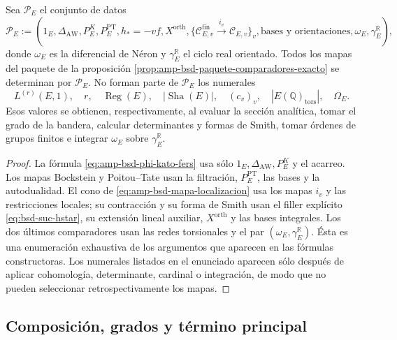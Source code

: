 \begin{lemma}
\label{lem:amp-bsd-independencia-termino-principal}
Sea \(\mathscr P_E\) el conjunto de datos
\begin{equation}\label{eq:amp-bsd-primitivas-paquete}
 \mathscr P_E:=
 \left(
  1_E,\Delta_{\mathrm{AW}},P_E^K,P_E^{\mathrm{PT}},
  h_*=-vf,X^{\mathrm{orth}},
  \{\mathcal C_{E,v}^{\mathrm{fin}}\xrightarrow{i_v}
     \mathcal C_{E,v}\}_v,
  \text{bases y orientaciones},
  \omega_E,\gamma_E^{\mathbb R}
 \right),
\end{equation}
donde \(\omega_E\) es la diferencial de Néron y
\(\gamma_E^{\mathbb R}\) el ciclo real orientado. Todos los mapas del
paquete de la proposición
\ref{prop:amp-bsd-paquete-comparadores-exacto} se determinan por
\(\mathscr P_E\). No forman parte de \(\mathscr P_E\) los numerales
\[
 L^{(r)}(E,1),\quad r,\quad\operatorname{Reg}(E),\quad
 |\operatorname{Sha}(E)|,\quad(c_v)_v,\quad
 |E(\mathbb Q)_{\mathrm{tors}}|,\quad\Omega_E.
\]
Esos valores se obtienen, respectivamente, al evaluar la sección analítica,
tomar el grado de la bandera, calcular determinantes y formas de Smith,
tomar órdenes de grupos finitos e integrar
\(\omega_E\) sobre \(\gamma_E^{\mathbb R}\).
\end{lemma}

\begin{proof}
La fórmula \eqref{eq:amp-bsd-phi-kato-fers} usa sólo
\(1_E,\Delta_{\mathrm{AW}},P_E^K\) y el acarreo. Los mapas Bockstein y
Poitou--Tate usan la filtración, \(P_E^{\mathrm{PT}}\), las bases y la
autodualidad. El cono de \eqref{eq:amp-bsd-mapa-localizacion} usa los
mapas \(i_v\) y las restricciones locales; su contracción y su forma de
Smith usan el filler explícito \eqref{eq:bsd-suc-hstar}, su extensión
lineal auxiliar, \(X^{\mathrm{orth}}\) y las bases integrales. Los dos
últimos comparadores usan las redes torsionales y el
par \((\omega_E,\gamma_E^{\mathbb R})\). Ésta es una enumeración exhaustiva
de los argumentos que aparecen en las fórmulas constructoras. Los
numerales listados en el enunciado aparecen sólo después de aplicar
cohomología, determinante, cardinal o integración, de modo que no pueden
seleccionar retrospectivamente los mapas.
\end{proof}

\subsection{Composición, grados y término principal}
\label{subsec:amp-bsd-composicion}

